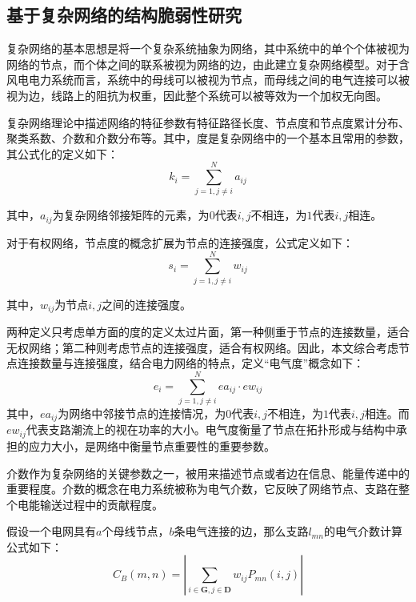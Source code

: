 \subsection{基于复杂网络的结构脆弱性研究}
\label{sec:network}
复杂网络的基本思想是将一个复杂系统抽象为网络，其中系统中的单个个体被视为网络的节点，而个体之间的联系被视为网络的边，由此建立复杂网络模型。对于含风电电力系统而言，系统中的母线可以被视为节点，而母线之间的电气连接可以被视为边，线路上的阻抗为权重，因此整个系统可以被等效为一个加权无向图\cite{networkE2,networkE3,networkE4}。

复杂网络理论中描述网络的特征参数有特征路径长度、节点度和节点度累计分布、聚类系数、介数和介数分布等\cite{networkE}。其中，度是复杂网络中的一个基本且常用的参数，其公式化的定义如下：
\begin{equation}
\label{equ:chap3:Index01}
k_i=\sum_{j=1,j\neq i}^{N}a_{ij}
\end{equation}

其中，$a_{ij}$为复杂网络邻接矩阵的元素，为$0$代表$i,j$不相连，为$1$代表$i,j$相连。

对于有权网络，节点度的概念扩展为节点的连接强度，公式定义如下：
\begin{equation}
\label{equ:chap3:Index02}
s_i=\sum_{j=1,j\neq i}^{N}w_{ij}
\end{equation}

其中，$w_{ij}$为节点$i,j$之间的连接强度。

两种定义只考虑单方面的度的定义太过片面，第一种侧重于节点的连接数量，适合无权网络；第二种则考虑节点的连接强度，适合有权网络。因此，本文综合考虑节点连接数量与连接强度，结合电力网络的特点，定义“电气度”概念如下：
\begin{equation}
\label{equ:chap3:Index03}
e_i=\sum_{j=1,j\neq i}^{N}ea_{ij}\cdot ew_{ij}
\end{equation}
其中，$ea_{ij}$为网络中邻接节点的连接情况，为$0$代表$i,j$不相连，为$1$代表$i,j$相连。而$ew_{ij}$代表支路潮流上的视在功率的大小。电气度衡量了节点在拓扑形成与结构中承担的应力大小，是网络中衡量节点重要性的重要参数。

介数作为复杂网络的关键参数之一，被用来描述节点或者边在信息、能量传递中的重要程度。介数的概念在电力系统被称为电气介数，它反映了网络节点、支路在整个电能输送过程中的贡献程度\cite{elecDu1,elecDu2,elecDu3}。

假设一个电网具有$a$个母线节点，$b$条电气连接的边，那么支路$l_{mn}$的电气介数计算公式如下：
\begin{equation}
\label{equ:chap3:Index1}
C_{B}(m,n)=\left|\sum_{i\in\mathbf{G},j\in\mathbf{D}}w_{ij}P_{mn}(i,j)\right|
\end{equation}


